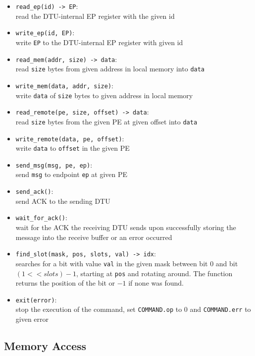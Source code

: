 \documentclass[a4paper,11pt,draft]{article}
\begin{document}
\begin{itemize}
  \item \texttt{read\_ep(id) -> EP}:\\
  read the DTU-internal EP register with the given id
  \item \texttt{write\_ep(id, EP)}:\\
  write \texttt{EP} to the DTU-internal EP register with given id
  \item \texttt{read\_mem(addr, size) -> data}:\\
  read \texttt{size} bytes from given address in local memory into \texttt{data}
  \item \texttt{write\_mem(data, addr, size)}:\\
  write \texttt{data} of \texttt{size} bytes to given address in local memory
  \item \texttt{read\_remote(pe, size, offset) -> data}:\\
  read \texttt{size} bytes from the given PE at given offset into \texttt{data}
  \item \texttt{write\_remote(data, pe, offset)}:\\
  write \texttt{data} to \texttt{offset} in the given PE
  \item \texttt{send\_msg(msg, pe, ep)}:\\
  send \texttt{msg} to endpoint \texttt{ep} at given PE
  \item \texttt{send\_ack()}:\\
  send ACK to the sending DTU
  \item \texttt{wait\_for\_ack()}:\\
  wait for the ACK the receiving DTU sends upon successfully storing the message into the receive
  buffer or an error occurred
  \item \texttt{find\_slot(mask, pos, slots, val) -> idx}:\\
  searches for a bit with value \texttt{val} in the given mask between bit 0 and bit $(1 << slots) -
  1$, starting at \texttt{pos} and rotating around. The function returns the position of the bit or
  $-1$ if none was found.
  \item \texttt{exit(error)}:\\
  stop the execution of the command, set \texttt{COMMAND.op} to 0 and \texttt{COMMAND.err} to given error
\end{itemize}

\subsection{Memory Access}
\end{document}
